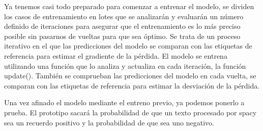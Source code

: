 Ya tenemos casi todo preparado para comenzar a entrenar el modelo, se dividen los casos de entrenamiento en lotes que se analizarán y evaluarán un número definido de iteraciones para asegurar que el entrenamiento es lo más preciso posible sin pasarnos de vueltas para que sea óptimo. Se trata de un proceso iterativo en el que las predicciones del modelo se comparan con las etiquetas de referencia para estimar el gradiente de la pérdida. El modelo se entrena utilizando una función que lo analiza y actualiza en cada iteración, la función update(). También se comprueban las predicciones del modelo en cada vuelta, se comparan con las etiquetas de referencia para estimar la desviación de la pérdida.

Una vez afinado el modelo mediante el entreno previo, ya podemos ponerlo a prueba. El prototipo sacará la probabilidad de que un texto procesado por spacy sea un recuerdo positivo y la probabilidad de que sea uno negativo. 